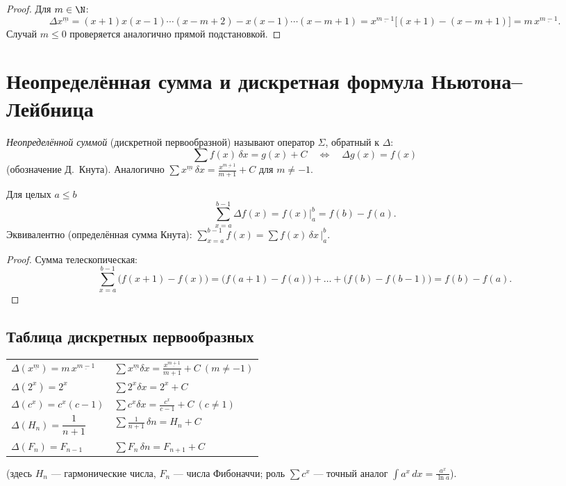 \begin{proof}
Для $m\in\N$:
\[
  \Delta x^{\underline m}=(x+1)x(x-1)\cdots(x-m+2)-x(x-1)\cdots(x-m+1)
   =x^{\underline{m-1}}\bigl[(x+1)-(x-m+1)\bigr]=m\,x^{\underline{m-1}}.
\]
Случай $m\le0$ проверяется аналогично прямой подстановкой.
\end{proof}

\section{Неопределённая сумма и дискретная формула Ньютона–Лейбница}

\begin{definition}
\emph{Неопределённой суммой} (дискретной первообразной) называют оператор $\Sigma$, обратный к
$\Delta$:
\[
  \sum f(x)\,\delta x=g(x)+C\quad\iff\quad \Delta g(x)=f(x)
\]
(обозначение Д.~Кнута). Аналогично $\displaystyle\sum x^{\underline m}\,\delta x
=\frac{x^{\underline{m+1}}}{m+1}+C$ для $m\ne-1$.
\end{definition}

\begin{theorem}
Для целых $a\le b$
\[
  \sum_{x=a}^{b-1}\Delta f(x)=f(x)\Big|_a^b=f(b)-f(a).
\]
Эквивалентно (определённая сумма Кнута):
$\displaystyle\sum_{x=a}^{b-1}f(x)=\sum f(x)\,\delta x\,\Big|_a^b$.
\end{theorem}

\begin{proof}
Сумма телескопическая:
\[
  \sum_{x=a}^{b-1}\bigl(f(x+1)-f(x)\bigr)=\bigl(f(a+1)-f(a)\bigr)+\dots+\bigl(f(b)-f(b-1)\bigr)
   =f(b)-f(a).
\]
\end{proof}

\subsection{Таблица дискретных первообразных}

\begin{center}
\renewcommand{\arraystretch}{1.5}
\begin{tabular}{ll}
$\Delta(x^{\underline{m}})=m\,x^{\underline{m-1}}$ & $\displaystyle\sum x^{\underline m}\delta x
  =\frac{x^{\underline{m+1}}}{m+1}+C\ (m\ne-1)$\\
$\Delta(2^{x})=2^{x}$ & $\displaystyle\sum 2^{x}\delta x=2^{x}+C$\\
$\Delta(c^{x})=c^{x}(c-1)$ & $\displaystyle\sum c^{x}\delta x=\frac{c^{x}}{c-1}+C\ (c\ne1)$\\
$\Delta(H_n)=\dfrac{1}{n+1}$ & $\displaystyle\sum \frac{1}{n+1}\,\delta n=H_n+C$\\
$\Delta(F_n)=F_{n-1}$ & $\displaystyle\sum F_n\,\delta n=F_{n+1}+C$\\
\end{tabular}
\end{center}
(здесь $H_n$ — гармонические числа, $F_n$ — числа Фибоначчи; роль $\sum c^x$ — точный аналог
$\int a^x\,dx=\tfrac{a^x}{\ln a}$).

